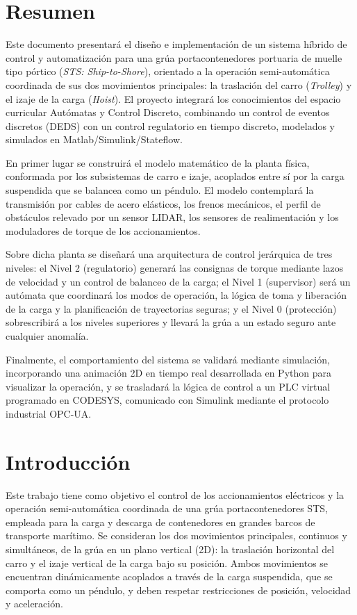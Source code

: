 \section{Resumen}
Este documento presentará el diseño e implementación de un sistema híbrido de control y
automatización para una grúa portacontenedores portuaria de muelle tipo pórtico
(\textit{STS: Ship-to-Shore}), orientado a la operación semi-automática coordinada de sus dos
movimientos principales: la traslación del carro (\textit{Trolley}) y el izaje de la carga
(\textit{Hoist}). El proyecto integrará los conocimientos del espacio curricular Autómatas y
Control Discreto, combinando un control de eventos discretos (DEDS) con un control regulatorio
en tiempo discreto, modelados y simulados en Matlab/Simulink/Stateflow.

En primer lugar se construirá el modelo matemático de la planta física, conformada por los
subsistemas de carro e izaje, acoplados entre sí por la carga suspendida que se balancea como
un péndulo. El modelo contemplará la transmisión por cables de acero elásticos, los frenos
mecánicos, el perfil de obstáculos relevado por un sensor LIDAR, los sensores de
realimentación y los moduladores de torque de los accionamientos.

Sobre dicha planta se diseñará una arquitectura de control jerárquica de tres niveles: el
Nivel 2 (regulatorio) generará las consignas de torque mediante lazos de velocidad y un control
de balanceo de la carga; el Nivel 1 (supervisor) será un autómata que coordinará los modos de
operación, la lógica de toma y liberación de la carga y la planificación de trayectorias
seguras; y el Nivel 0 (protección) sobrescribirá a los niveles superiores y llevará la grúa a un
estado seguro ante cualquier anomalía.

Finalmente, el comportamiento del sistema se validará mediante simulación, incorporando una
animación 2D en tiempo real desarrollada en Python para visualizar la operación, y se trasladará
la lógica de control a un PLC virtual programado en CODESYS, comunicado con Simulink
mediante el protocolo industrial OPC-UA.


\newpage
\section{Introducción}
Este trabajo tiene como objetivo el control de los accionamientos eléctricos y la operación
semi-automática coordinada de una grúa portacontenedores STS,
empleada para la carga y descarga de contenedores en grandes barcos de transporte marítimo. Se
consideran los dos movimientos principales, continuos y simultáneos, de la grúa en un plano
vertical (2D): la traslación horizontal del carro y el izaje vertical de la carga bajo su
posición. Ambos movimientos se encuentran dinámicamente acoplados a través de la carga suspendida, que se comporta
como un péndulo, y deben respetar restricciones de posición, velocidad y aceleración.

